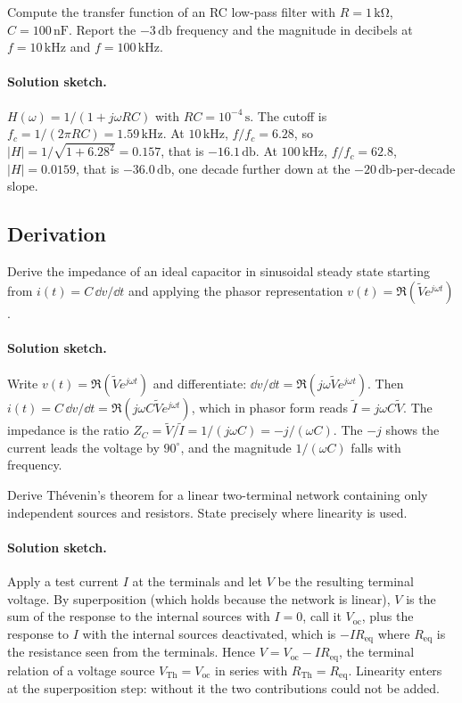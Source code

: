 \begin{exercise}
Compute the transfer function of an RC low-pass filter with $R =
1\,\si{\kilo\ohm}$, $C = 100\,\si{\nano\farad}$. Report the $-3\,\si{
\decibel}$ frequency and the magnitude in decibels at $f = 10\,\si{
\kilo\hertz}$ and $f = 100\,\si{\kilo\hertz}$.
\paragraph{Solution sketch.}
$H(\omega) = 1/(1+j\omega RC)$ with $RC = 10^{-4}\,\si{\second}$. The
cutoff is $f_{c} = 1/(2\pi RC) = 1.59\,\si{\kilo\hertz}$. At
$10\,\si{\kilo\hertz}$, $f/f_{c} = 6.28$, so $|H| = 1/\sqrt{1+6.28^{2}}
= 0.157$, that is $-16.1\,\si{\decibel}$. At $100\,\si{\kilo\hertz}$,
$f/f_{c} = 62.8$, $|H| = 0.0159$, that is $-36.0\,\si{\decibel}$, one
decade further down at the $-20\,\si{\decibel}$-per-decade slope.
\end{exercise}

\subsection*{Derivation}

\begin{exercise}
Derive the impedance of an ideal capacitor in sinusoidal steady state
starting from $i(t) = C\,\dd v/\dd t$ and applying the phasor
representation $v(t) = \Re(\tilde V e^{j\omega t})$.
\paragraph{Solution sketch.}
Write $v(t) = \Re(\tilde V e^{j\omega t})$ and differentiate:
$\dd v/\dd t = \Re(j\omega\tilde V e^{j\omega t})$. Then $i(t) =
C\,\dd v/\dd t = \Re(j\omega C\tilde V e^{j\omega t})$, which in phasor
form reads $\tilde I = j\omega C\tilde V$. The impedance is the ratio
$Z_{C} = \tilde V/\tilde I = 1/(j\omega C) = -j/(\omega C)$. The
$-j$ shows the current leads the voltage by $90^\circ$, and the
magnitude $1/(\omega C)$ falls with frequency.
\end{exercise}

\begin{exercise}
Derive Th\'evenin's theorem for a linear two-terminal network
containing only independent sources and resistors. State precisely
where linearity is used.
\paragraph{Solution sketch.}
Apply a test current $I$ at the terminals and let $V$ be the resulting
terminal voltage. By superposition (which holds because the network is
linear), $V$ is the sum of the response to the internal sources with
$I = 0$, call it $V_{\text{oc}}$, plus the response to $I$ with the
internal sources deactivated, which is $-IR_{\text{eq}}$ where
$R_{\text{eq}}$ is the resistance seen from the terminals. Hence
$V = V_{\text{oc}} - IR_{\text{eq}}$, the terminal relation of a
voltage source $V_{\text{Th}} = V_{\text{oc}}$ in series with
$R_{\text{Th}} = R_{\text{eq}}$. Linearity enters at the superposition
step: without it the two contributions could not be added.
\end{exercise}

